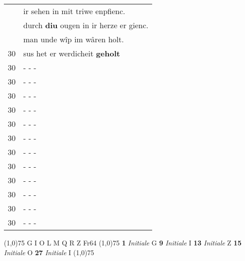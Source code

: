 \documentclass[8pt,a4paper,notitlepage]{article}
\begin{document}
\begin{table}[ht]
\begin{minipage}[t]{0.5\linewidth}
\begin{tabular}{rl}
 & ir sehen in mit triwe enpfienc.\\ 
 & durch \textbf{diu} ougen in ir herze er gienc.\\ 
 & man unde wîp im wâren holt.\\ 
30 & sus het er werdicheit \textbf{geholt}\\ 
30 & \multicolumn{1}{l}{ - - - }\\ 
30 & \multicolumn{1}{l}{ - - - }\\ 
30 & \multicolumn{1}{l}{ - - - }\\ 
30 & \multicolumn{1}{l}{ - - - }\\ 
30 & \multicolumn{1}{l}{ - - - }\\ 
30 & \multicolumn{1}{l}{ - - - }\\ 
30 & \multicolumn{1}{l}{ - - - }\\ 
30 & \multicolumn{1}{l}{ - - - }\\ 
30 & \multicolumn{1}{l}{ - - - }\\ 
30 & \multicolumn{1}{l}{ - - - }\\ 
30 & \multicolumn{1}{l}{ - - - }\\ 
30 & \multicolumn{1}{l}{ - - - }\\ 
\end{tabular}
\scriptsize
\line(1,0){75} \newline
G I O L M Q R Z Fr64 \newline
\line(1,0){75} \newline
\textbf{1} \textit{Initiale} G  \textbf{9} \textit{Initiale} I  \textbf{13} \textit{Initiale} Z  \textbf{15} \textit{Initiale} O  \textbf{27} \textit{Initiale} I  \newline
\line(1,0){75} \newline

\end{minipage}
\end{table}
\end{document}

